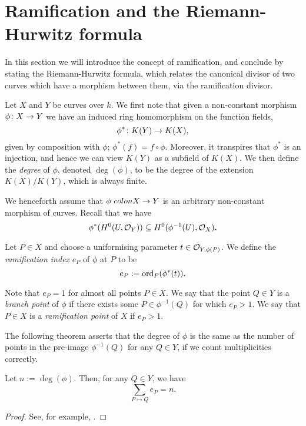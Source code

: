 \section{Ramification and the Riemann-Hurwitz formula}

In this section we will introduce the concept of ramification, and conclude by stating the Riemann-Hurwitz formula, which relates the canonical divisor of two curves which have a morphism between them, via the ramification divisor.



Let $X$ and $Y$ be curves over $k$.
We first note that given a non-constant morphism $\phi \colon X \rightarrow Y$ we have an induced ring homomorphism on the function fields,
    \[
    \phi^* \colon K(Y) \rightarrow K(X),
    \]
given by composition with $\phi$; \ie $\phi^*(f) = f \circ \phi$.
Moreover, it transpires that $\phi^*$ is an injection, and hence we can view $K(Y)$ as a subfield of $K(X)$.
We then define the \emph{degree} of $\phi$, denoted $\deg(\phi)$, to be the degree of the extension $K(X)/K(Y)$, which is always finite.

We henceforth assume that $\phi \ colon X \rightarrow Y$ is an arbitrary non-constant morphism of curves.
Recall that we have
    \[
    \phi^*(H^0(U,{\cal O}_Y)) \subseteq H^0(\phi^{-1}(U),{\cal O}_X).
    \]

    \begin{defn}
    Let $P \in X$ and choose a uniformising parameter $t \in {\cal O}_{Y,\phi(P)}$.
    We define the \emph{ramification index} $e_P$ of $\phi$ at $P$ to be
        \[
        e_P := \operatorname{ord}_P(\phi^*(t)).
        \]
    \end{defn}

Note that $e_P =1$ for almost all points $P \in X$.
We say that the point $Q \in Y$ is a \emph{branch point} of $\phi$ if there exists some $P \in \phi^{-1}(Q)$ for which $e_P >1$.
We say that $P \in X$ is a \emph{ramification point} of $X$ if $e_P >1$.

The following theorem asserts that the degree of $\phi$ is the same as the number of points in the pre-image $\phi^{-1}(Q)$ for any $Q \in Y$, if we count multiplicities correctly.

    \begin{thm}
    Let $n := \deg(\phi)$.
    Then, for any $Q \in Y$, we have 
        \[
        \sum_{P \mapsto Q} e_P = n.
        \]
    \end{thm}
    \begin{proof}
    See, for example, \cite[Pg.\ 290]{liu}.
    \end{proof}

